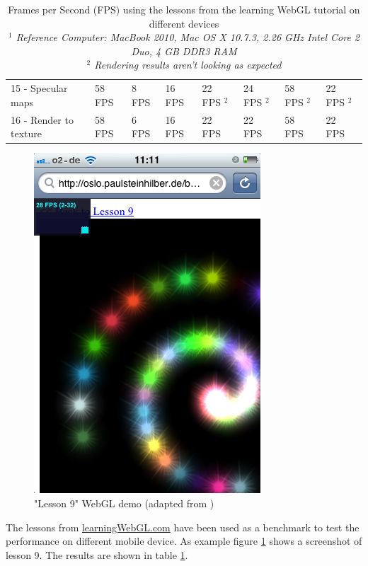 \documentclass[12pt,journal,compsoc]{IEEEtran}
\begin{document}
\begin{table}[tb]
\begin{centering}
\begin{tabular}{l|l|l|l|l|l|l|l}
		15 - Specular maps							& 58 FPS		&  8 FPS		& 16 FPS		& 22 FPS $^{2}$	& 24 FPS $^{2}$	& 58 FPS $^{2}$	& 22 FPS $^{2}$ 		\\
		16 - Render to texture						& 58 FPS		&  6 FPS		& 16 FPS		& 22 FPS		& 22 FPS		& 58 FPS	& 22 FPS				\\
	\end{tabular}
	\caption{Frames per Second (FPS) using the lessons from the learning WebGL tutorial on different devices\label{lessonsTable}
	\\\textit{$^{1}$ Reference Computer: MacBook 2010, Mac OS X 10.7.3, 2.26 GHz Intel Core 2 Duo, 4 GB DDR3 RAM}
	\\\textit{$^{2}$ Rendering results aren't looking as expected}
	}
	\end{centering}
\end{table}

\begin{figure}
	\centerline{\includegraphics[width=0.6\columnwidth]{grafiken/lesson9}}
	\caption{"Lesson 9" WebGL demo (adapted from \cite{lesson9})}
	\label{fig:lesson9}
\end{figure}

The lessons from \url{learningWebGL.com} \cite{learningwebgl} have been used as a benchmark to test the performance on different mobile device. As example figure \ref{fig:lesson9} shows a screenshot of lesson 9. The results are shown in table \ref{lessonsTable}.
\end{document}
